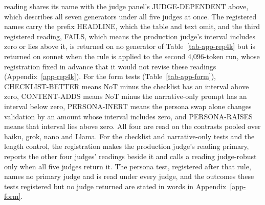 reading shares its name with the judge panel's JUDGE-DEPENDENT above, which
describes all seven generators under all five judges at once. The registered
names carry the prefix HEADLINE, which the table and text omit, and the third
registered reading, FAILS, which means the production judge's interval
includes zero or lies above it, is returned on no generator of
Table~\ref{tab-app-rep4k} but is returned on sonnet when the rule is applied
to the second 4,096-token run, whose registration fixed in advance that it
would not revise these readings (Appendix~\ref{app-rep4k}).
For the form tests (Table~\ref{tab-app-form}), CHECKLIST-BETTER means NoT
minus the checklist has an interval above zero, CONTENT-ADDS means NoT minus
the narrative-only prompt has an interval below zero, PERSONA-INERT means the
persona swap alone changes validation by an amount whose interval includes
zero, and PERSONA-RAISES means that interval lies above zero.
All four are read on the contrasts pooled over haiku, grok, nano and Llama.
For the checklist and narrative-only tests and the length control, the
registration makes the production judge's reading primary, reports the other
four judges' readings beside it and calls a reading judge-robust only when all
five judges return it. The persona test, registered after that rule, names no
primary judge and is read under every judge, and the outcomes these tests
registered but no judge returned are stated in words in
Appendix~\ref{app-form}.
